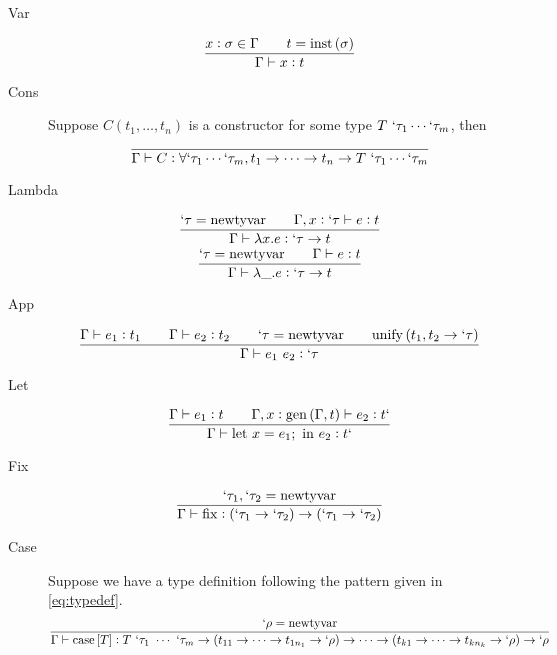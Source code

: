 \documentclass[12pt]{article}
\newcommand{\newtyvar}{\mathrm{newtyvar}}
\newcommand{\inst}[1]{\mathrm{inst}\del{#1}}
\newcommand{\gen}[2]{\mathrm{gen}\del{#1, #2}}
\newcommand{\unify}[2]{\mathrm{unify}\del{#1, #2}}
\newcommand{\thmlet}[2]{\mathrm{let}~#1~\mathrm{in}~#2}
\newcommand{\thmfix}{\mathrm{fix}}
\newcommand{\thmcase}[1]{\mathrm{case}\sbr{#1}}
\begin{document}
\begin{description}
\item[Var]
  \begin{equation}
    \frac{x : \sigma \in \Gamma \qquad t = \inst{\sigma}}{\Gamma \vdash x : t}
  \end{equation}

\item[Cons] Suppose $C(t_1,\ldots,t_n)$ is a constructor for some type
  $T~`\tau_1\cdots`\tau_m$, then
  \begin{equation}
    \frac{}{\Gamma \vdash C : \forall `\tau_1 \cdots `\tau_m, t_1 \to \cdots \to t_n \to T~`\tau_1 \cdots `\tau_m}
  \end{equation}

\item[Lambda]
  \begin{gather}
    \frac{`\tau = \newtyvar \qquad \Gamma, x : `\tau \vdash e : t}{\Gamma \vdash \lambda x. e : `\tau \to t}\\
    \frac{`\tau = \newtyvar \qquad \Gamma \vdash e : t}{\Gamma \vdash \lambda \_. e : `\tau \to t}
  \end{gather}

\item[App]
  \begin{equation}
    \frac{\Gamma \vdash e_1 : t_1 \qquad \Gamma \vdash e_2 : t_2 \qquad `\tau = \newtyvar \qquad \unify{t_1}{t_2 \to `\tau}}{\Gamma \vdash e_1~e_2 : `\tau}
  \end{equation}

\item[Let]
  \begin{equation}
    \frac{\Gamma \vdash e_1 : t \qquad \Gamma, x : \gen{\Gamma}{t} \vdash e_2 : t`}{\Gamma \vdash \thmlet{x = e_1;}{e_2} : t`}
  \end{equation}

\item[Fix]
  \begin{equation}
    \frac{`\tau_1, `\tau_2 = \newtyvar}{\Gamma \vdash \thmfix : (`\tau_1 \to `\tau_2) \to (`\tau_1 \to `\tau_2)}
  \end{equation}

\item[Case] Suppose we have a type definition following the pattern
  given in \eqref{eq:typedef}.
  \begin{equation}
    \frac{`\rho = \newtyvar}{\Gamma \vdash \thmcase{T} : T~`\tau_1~\cdots~`\tau_m \to (t_{11} \to \cdots \to t_{1n_1} \to `\rho) \to \cdots \to (t_{k1} \to \cdots \to t_{kn_k} \to `\rho) \to `\rho}
  \end{equation}
\end{description}
\end{document}
